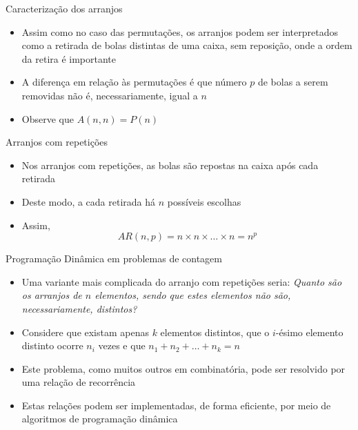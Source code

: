\begin{frame}[fragile]{Caracterização dos arranjos}

    \begin{itemize}
        \item Assim como no caso das permutações, os arranjos podem ser interpretados como a
            retirada de bolas distintas de uma caixa, sem reposição, onde a ordem da retira é
            importante

        \item A diferença em relação às permutações é que número $p$ de bolas a serem removidas não
            é, necessariamente, igual a $n$

        \item Observe que $A(n, n) = P(n)$
    \end{itemize}

\end{frame}

\begin{frame}[fragile]{Arranjos com repetições}

    \begin{itemize}
        \item Nos arranjos com repetições, as bolas são repostas na caixa após cada retirada 

        \item Deste modo, a cada retirada há $n$ possíveis escolhas

        \item Assim,
    $$
        AR(n, p) = n \times n \times \ldots \times n = n^p
    $$
    \end{itemize}

\end{frame}

\begin{frame}[fragile]{Programação Dinâmica em problemas de contagem}

    \begin{itemize}
        \item Uma variante mais complicada do arranjo com repetições seria: \textit{Quanto são os
            arranjos de $n$ elementos, sendo que estes elementos não são, necessariamente, distintos?}

        \item Considere que existam apenas $k$ elementos distintos, que o $i$-ésimo elemento 
            distinto ocorre $n_i$ vezes e que $n_1 + n_2 + \ldots + n_k = n$

        \item Este problema, como muitos outros em combinatória, pode ser resolvido por uma relação
           de recorrência

        \item Estas relações podem ser implementadas, de forma eficiente, por meio de algoritmos de
            programação dinâmica
    \end{itemize}

\end{frame}

